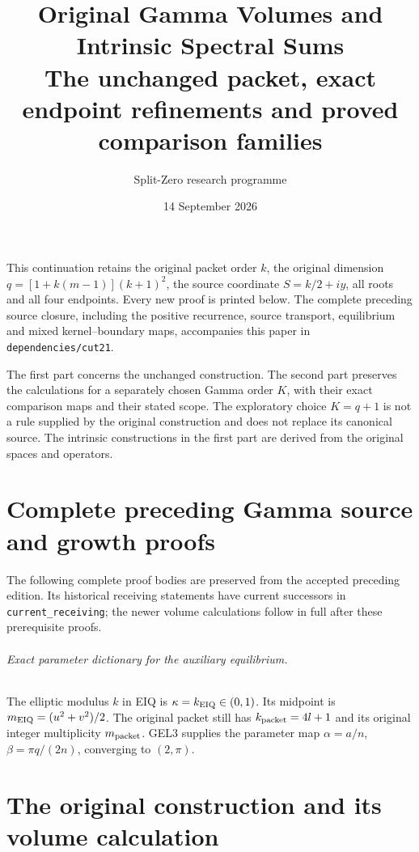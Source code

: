 \documentclass[11pt,a4paper]{article}
\title{Original Gamma Volumes and Intrinsic Spectral Sums\\[3pt]
\large The unchanged packet, exact endpoint refinements and proved comparison families}
\author{Split-Zero research programme}
\date{14 September 2026}
\begin{document}
\maketitle
This continuation retains the original packet order $k$, the original
dimension $q=[1+k(m-1)](k+1)^2$, the source coordinate $S=k/2+iy$,
all roots and all four endpoints. Every new proof is printed below.
The complete preceding source closure, including the positive recurrence,
source transport, equilibrium and mixed kernel--boundary maps, accompanies
this paper in \texttt{dependencies/cut21}.

The first part concerns the unchanged construction. The second part
preserves the calculations for a separately chosen Gamma order $K$,
with their exact comparison maps and their stated scope. The exploratory
choice $K=q+1$ is not a rule supplied by the original construction and
does not replace its canonical source. The intrinsic constructions in
the first part are derived from the original spaces and operators.

\tableofcontents
\clearpage

\part*{Complete preceding Gamma source and growth proofs}
The following complete proof bodies are preserved from the accepted
preceding edition. Its historical receiving statements have current
successors in \texttt{current\_receiving}; the newer volume calculations
follow in full after these prerequisite proofs.

\clearpage

\clearpage

\clearpage

\clearpage
\paragraph{Exact parameter dictionary for the auxiliary equilibrium.}
The elliptic modulus $k$ in EIQ is $\kappa=k_{\rm EIQ}\in(0,1)$.
Its midpoint is $m_{\rm EIQ}=(u^2+v^2)/2$.
The original packet still has $k_{\rm packet}=4l+1$ and its original
integer multiplicity $m_{\rm packet}$. GEL3 supplies the parameter map
$\alpha=a/n$, $\beta=\pi q/(2n)$, converging to $(2,\pi)$.

\clearpage

\clearpage

\clearpage
\part{The original construction and its volume calculation}

\clearpage

\clearpage

\clearpage

\clearpage

\clearpage

\clearpage

\clearpage

\clearpage

\clearpage

\end{document}
